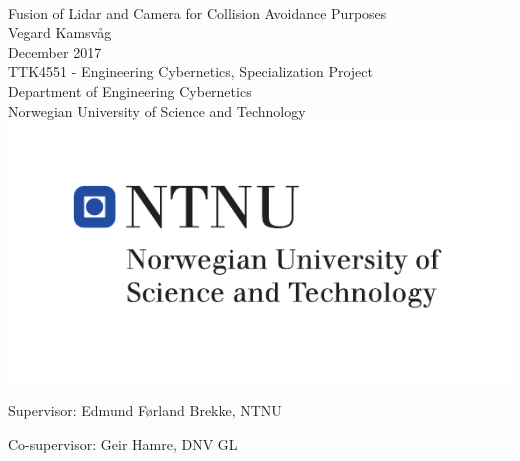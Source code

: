 \thispagestyle{empty}
\mbox{}\\[0pc]
\begin{center}
\Huge{Fusion of Lidar and Camera for Collision Avoidance Purposes}\\[2pc]
 
\Large{Vegard Kamsv\aa g}\\[1pc]
\large{December 2017}\\[2pc]
 
TTK4551 - Engineering Cybernetics, Specialization Project\\
Department of Engineering Cybernetics\\
Norwegian University of Science and Technology\\
\vspace{140pt}
\includegraphics[scale=0.8]{fig/logontnu_eng.pdf}
\end{center}
\vfill
 
 
 
\noindent Supervisor: Edmund F\o rland Brekke, NTNU
 
\noindent Co-supervisor: Geir Hamre, DNV GL
 
\cleardoublepage